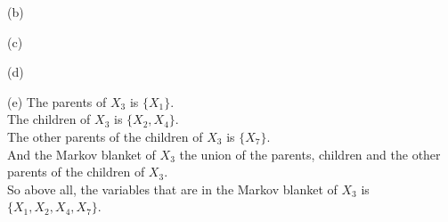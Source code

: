 \documentclass[10pt]{article}
\begin{document}
\begin{enumerate}[1.]
		(b)




		(c)



		(d)




		(e) The parents of $X_3$ is $\{X_1\}$.\\
		The children of $X_3$ is $\{X_2,X_4\}$.\\
		The other parents of the children of $X_3$ is $\{X_7\}$.\\
		And the Markov blanket of $X_3$ the union of the parents, children and the other parents of the children of $X_3$.\\

		So above all, the variables that are in the Markov blanket of $X_3$ is $\{X_1,X_2,X_4,X_7\}$.

\end{enumerate}
\end{document}
